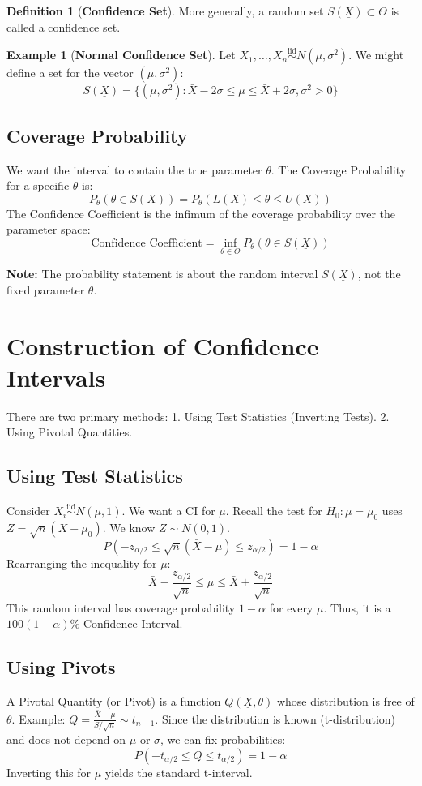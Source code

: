 \documentclass[12pt, a4paper]{article}
\theoremstyle{definition}
\newtheorem{definition}{Definition}
\newtheorem{example}{Example}
\newcommand{\iid}{\overset{\text{iid}}{\sim}}
\newcommand{\Xvec}{\underline{X}}
\begin{document}
\begin{definition}[\textbf{Confidence Set}]
More generally, a random set $S(\Xvec) \subset \Theta$ is called a confidence set.
\end{definition}

\begin{example}[\textbf{Normal Confidence Set}]
Let $X_1, \dots, X_n \iid N(\mu, \sigma^2)$.
We might define a set for the vector $(\mu, \sigma^2)$:
$$ S(\Xvec) = \{ (\mu, \sigma^2) : \bar{X} - 2\sigma \le \mu \le \bar{X} + 2\sigma, \sigma^2 > 0 \} $$
\end{example}

\subsection{Coverage Probability}
We want the interval to contain the true parameter $\theta$.
The Coverage Probability for a specific $\theta$ is:
$$ P_\theta(\theta \in S(\Xvec)) = P_\theta(L(\Xvec) \le \theta \le U(\Xvec)) $$
The Confidence Coefficient is the infimum of the coverage probability over the parameter space:
$$ \text{Confidence Coefficient} = \inf_{\theta \in \Theta} P_\theta(\theta \in S(\Xvec)) $$

\textbf{Note:} The probability statement is about the random interval $S(\Xvec)$, not the fixed parameter $\theta$.

\section{Construction of Confidence Intervals}

There are two primary methods:
1. Using Test Statistics (Inverting Tests).
2. Using Pivotal Quantities.

\subsection{Using Test Statistics}
Consider $X_i \iid N(\mu, 1)$. We want a CI for $\mu$.
Recall the test for $H_0: \mu = \mu_0$ uses $Z = \sqrt{n}(\bar{X} - \mu_0)$.
We know $Z \sim N(0, 1)$.
$$ P(-z_{\alpha/2} \le \sqrt{n}(\bar{X} - \mu) \le z_{\alpha/2}) = 1 - \alpha $$
Rearranging the inequality for $\mu$:
$$ \bar{X} - \frac{z_{\alpha/2}}{\sqrt{n}} \le \mu \le \bar{X} + \frac{z_{\alpha/2}}{\sqrt{n}} $$
This random interval has coverage probability $1-\alpha$ for every $\mu$. Thus, it is a $100(1-\alpha)\%$ Confidence Interval.

\subsection{Using Pivots}
A Pivotal Quantity (or Pivot) is a function $Q(\Xvec, \theta)$ whose distribution is free of $\theta$.
Example: $Q = \frac{\bar{X} - \mu}{S/\sqrt{n}} \sim t_{n-1}$.
Since the distribution is known (t-distribution) and does not depend on $\mu$ or $\sigma$, we can fix probabilities:
$$ P(-t_{\alpha/2} \le Q \le t_{\alpha/2}) = 1 - \alpha $$
Inverting this for $\mu$ yields the standard t-interval.
\end{document}
